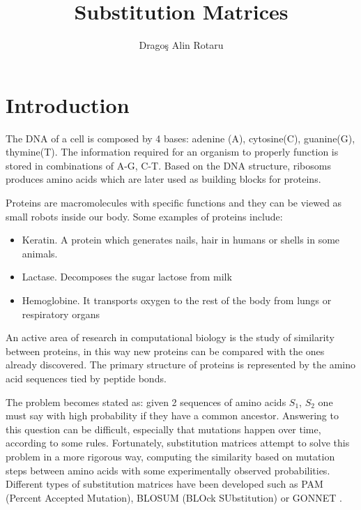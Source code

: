 \documentclass{llncs}
\begin{document}
\pagestyle{empty}
\title{Substitution Matrices}

\author{Drago\c{s} Alin Rotaru}
\maketitle

\section{Introduction}

The DNA of a cell is composed by 4 bases: adenine (A), cytosine(C), guanine(G), thymine(T). The information required for an organism to properly function is stored in combinations of A-G, C-T. Based on the DNA structure, ribosoms produces amino acids which are later used as building blocks for proteins.

Proteins are macromolecules with specific functions and they can be viewed as small robots inside our body.
Some examples of proteins include:
\begin{itemize}
	\item Keratin. A protein which generates nails, hair in humans or shells in some animals.
	\item Lactase. Decomposes the sugar lactose from milk
	\item Hemoglobine. It transports oxygen to the rest of the body from lungs or respiratory organs
\end{itemize}

An active area of research in computational biology is the study of similarity between proteins, in this way new proteins can be compared with the ones already discovered. The primary structure of proteins is represented by the amino acid sequences tied by peptide bonds.

The problem becomes stated as: given 2 sequences of amino acids $S_1$, $S_2$ one must say with high probability if they have a common ancestor.
Answering to this question can be difficult, especially that mutations happen over time, according to some rules. Fortunately, substitution matrices attempt to solve this problem in a more rigorous way, computing the similarity based on mutation steps between amino acids with some experimentally observed probabilities. Different types of substitution matrices have been developed such as PAM (Percent Accepted Mutation), BLOSUM (BLOck SUbstitution) or GONNET \cite{dayhoff:1978, henikoff:1992, bennet:1994}.
\end{document}
